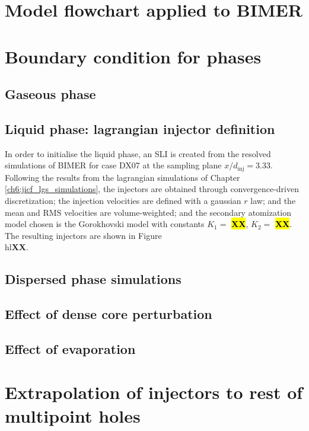 \section{Model flowchart applied to BIMER}
\label{sec:ch9_BIMER_SLI_flowchart}

\section{Boundary condition for phases}
\label{sec:ch9_BIMER_BCs_for_phases}

\subsection{Gaseous phase}

\subsection{Liquid phase: lagrangian injector definition}

In order to initialise the liquid phase, an SLI is created from the resolved simulations of BIMER for case DX07 at the sampling plane $x/d_\mathrm{inj} = 3.33$. Following the results from the lagrangian simulations of Chapter \ref{ch6:jicf_lgs_simulations}, the injectors are obtained through convergence-driven discretization; the injection velocities are defined with a gaussian $r$ law; and the mean and RMS velocities are volume-weighted; and the secondary atomization model chosen is the Gorokhovski model with constants $K_1 = $ \hl{\textbf{XX}}, $K_2 = $ \hl{\textbf{XX}}. The resulting injectors are shown in Figure \\hl{\textbf{XX}}.


\subsection{Dispersed phase simulations}

\subsection{Effect of dense core perturbation}

\subsection{Effect of evaporation}

\section{Extrapolation of injectors to rest of multipoint holes}

